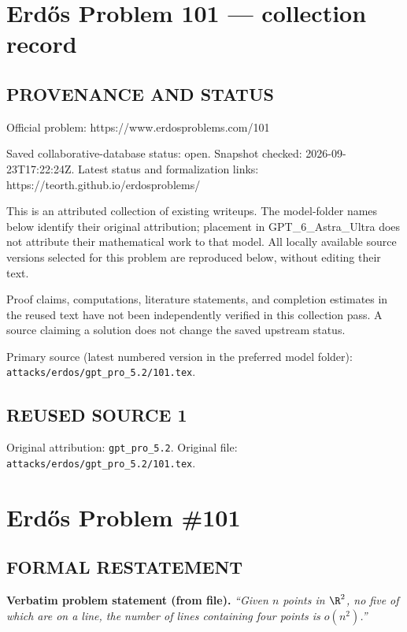 \section*{Erd\H{o}s Problem 101 --- collection record}

\subsection*{PROVENANCE AND STATUS}
Official problem: https://www.erdosproblems.com/101

Saved collaborative-database status: open.
Snapshot checked: 2026-09-23T17:22:24Z.
Latest status and formalization links: https://teorth.github.io/erdosproblems/

This is an attributed collection of existing writeups. The model-folder names below identify their original attribution; placement in GPT\_6\_Astra\_Ultra does not attribute their mathematical work to that model. All locally available source versions selected for this problem are reproduced below, without editing their text.

Proof claims, computations, literature statements, and completion estimates in the reused text have not been independently verified in this collection pass. A source claiming a solution does not change the saved upstream status.

Primary source (latest numbered version in the preferred model folder): \texttt{attacks/erdos/gpt\_pro\_5.2/101.tex}.

\subsection*{REUSED SOURCE 1}
Original attribution: \texttt{gpt\_pro\_5.2}.
Original file: \texttt{attacks/erdos/gpt\_pro\_5.2/101.tex}.

\section*{Erd\H{o}s Problem \#101}

\subsection*{FORMAL RESTATEMENT}
\noindent\textbf{Verbatim problem statement (from file).}
\emph{``Given $n$ points in $\R^2$, no five of which are on a line, the number of lines containing four points is $o(n^2)$.''}

